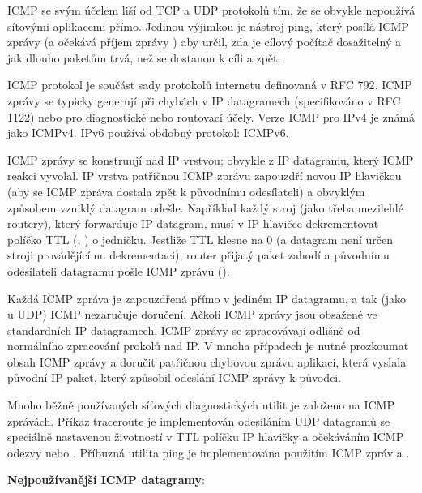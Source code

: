 ICMP se svým účelem liší od TCP a UDP protokolů tím, že se obvykle nepoužívá sítovými aplikacemi přímo. Jedinou výjimkou je nástroj ping, který posílá ICMP zprávy  (a očekává příjem zprávy ) aby určil, zda je cílový počítač dosažitelný a jak dlouho paketům trvá, než se dostanou k cíli a zpět.

ICMP protokol je součást sady protokolů internetu definovaná v RFC 792. ICMP zprávy se typicky generují při chybách v IP datagramech (specifikováno v RFC 1122) nebo pro diagnostické nebo routovací účely. Verze ICMP pro IPv4 je známá jako ICMPv4. IPv6 používá obdobný protokol: ICMPv6.

ICMP zprávy se konstruují nad IP vrstvou; obvykle z IP datagramu, který ICMP reakci vyvolal. IP vrstva patřičnou ICMP zprávu zapouzdří novou IP hlavičkou (aby se ICMP zpráva dostala zpět k původnímu odesílateli) a obvyklým způsobem vzniklý datagram odešle. Například každý stroj (jako třeba mezilehlé routery), který forwarduje IP datagram, musí v IP hlavičce dekrementovat políčko TTL (, ) o jedničku. Jestliže TTL klesne na 0 (a datagram není určen stroji provádějícímu dekrementaci), router přijatý paket zahodí a původnímu odesílateli datagramu pošle ICMP zprávu  ().

Každá ICMP zpráva je zapouzdřená přímo v jediném IP datagramu, a tak (jako u UDP) ICMP nezaručuje doručení. Ačkoli ICMP zprávy jsou obsažené ve standardních IP datagramech, ICMP zprávy se zpracovávají odlišně od normálního zpracování prokolů nad IP. V mnoha případech je nutné prozkoumat obsah ICMP zprávy a doručit patřičnou chybovou zprávu aplikaci, která vyslala původní IP paket, který způsobil odeslání ICMP zprávy k původci.

Mnoho běžně používaných síťových diagnostických utilit je založeno na ICMP zprávách. Příkaz traceroute je implementován odesíláním UDP datagramů se speciálně nastavenou životností v TTL políčku IP hlavičky a očekáváním ICMP odezvy  nebo . Příbuzná utilita ping je implementována použitím ICMP zpráv  a .

\textbf{Nejpoužívanější ICMP datagramy}:

